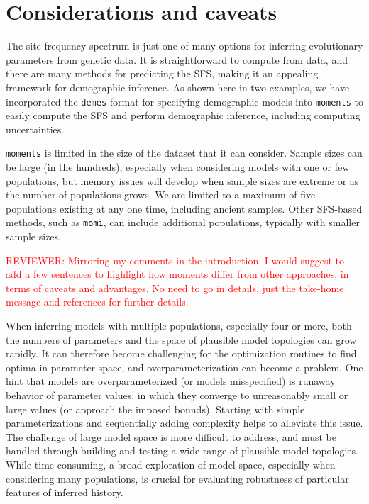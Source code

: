\documentclass[]{article}
\newcommand{\reviewercomment}[1]{{\textcolor{red}{REVIEWER: #1}}}
\newcommand{\moments}{\texttt{moments}\xspace}
\newcommand{\demes}{\texttt{demes}\xspace}
\newcommand{\momi}{\texttt{momi}\xspace}
\begin{document}
\section*{Considerations and caveats}\label{sec:conclusions}

The site frequency spectrum is just one of many options for inferring
evolutionary parameters from genetic data. It is straightforward to compute
from data, and there are many methods for predicting the SFS, making it an
appealing framework for demographic inference. As shown here in two examples,
we have incorporated the \demes format for specifying demographic models into
\moments to easily compute the SFS and perform demographic inference, including
computing uncertainties.

\moments is limited in the size of the dataset that it can consider. Sample
sizes can be large (in the hundreds), especially when considering models with
one or few populations, but memory issues will develop when sample sizes are
extreme or as the number of populations grows. We are limited to a maximum of
five populations existing at any one time, including ancient samples. Other
SFS-based methods, such as \momi \cite{kamm2020efficiently, dilber2024faster},
can include additional populations, typically with smaller sample sizes.

\reviewercomment{Mirroring my comments in the introduction, I would suggest to add a few sentences to highlight how moments differ from other approaches, in terms of caveats and advantages. No need to go in details, just the take-home message and references for further details.}

When inferring models with multiple populations, especially four or more, both
the numbers of parameters and the space of plausible model topologies can grow
rapidly. It can therefore become challenging for the optimization routines to
find optima in parameter space, and overparameterization can become a problem.
One hint that models are overparameterized (or models misspecified) is runaway
behavior of parameter values, in which they converge to unreasonably small or
large values (or approach the imposed bounds). Starting with simple
parameterizations and sequentially adding complexity helps to alleviate this
issue. The challenge of large model space is more difficult to address, and
must be handled through building and testing a wide range of plausible model
topologies. While time-consuming, a broad exploration of model space,
especially when considering many populations, is crucial for evaluating
robustness of particular features of inferred history.
\end{document}
